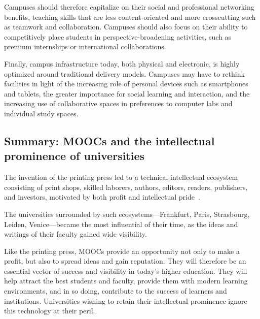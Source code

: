 Campuses should therefore capitalize on their social and professional
networking benefits, teaching skills that are less content-oriented and
more crosscutting such as teamwork and collaboration.
Campuses should also focus on their ability to competitively place
students in perspective-broadening
activities, such as premium internships or international collaborations.

Finally, campus infrastructure today, both physical and electronic, is
highly optimized around traditional delivery models.
Campuses may have to rethink facilities in light of the increasing role
of personal devices such as 
smartphones and tablets, the greater importance for social learning and
interaction, and the increasing use of collaborative spaces in
preferences to computer labs and individual study spaces.

\subsection{Summary: MOOCs and the intellectual prominence of
  universities} The invention of the printing press led to a
technical-intellectual ecosystem consisting of print shops, skilled
laborers, authors, editors, readers, publishers, and investors,
motivated by both profit and intellectual pride~\cite{febvre}.

The universities surrounded by such ecosystems---Frankfurt, Paris,
Strasbourg, Leiden, Venice---became the most influential of their
time, as the ideas and writings of their faculty gained wide visibility.

Like the printing press, 
MOOCs provide an opportunity not only to make a profit, but also
to spread ideas and gain reputation. They will therefore be an
essential vector of success and visibility in today's higher
education. They will help attract the best students and
faculty, provide them with modern learning environments, and in so doing,
contribute to the success of learners and institutions.
Universities wishing to retain their intellectual
prominence ignore this technology at their peril.



